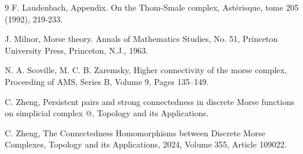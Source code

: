 \documentclass[a4paper,12pt,notitlepage]{amsart}
\makeatletter
\theoremstyle{definition}%
\theoremstyle{definition}%
\theoremstyle{definition}%
\newcommand*{\rom}[1]{\expandafter\@slowromancap\romannumeral #1@}
\makeatother
\begin{document}
\begin{thebibliography}{9}
F.  Laudenbach,
Appendix. On the Thom-Smale complex,
Astérisque, tome 205 (1992),  219-233.


J. Milnor, Morse theory.  Annals of Mathematics
Studies, No. 51, Princeton University Press, Princeton, N.J., 1963.








N. A. Scoville, M. C. B. Zaremsky,
Higher connectivity of the morse complex,
Proceeding of AMS, Series B,
Volume 9, Pages 135–149.



C. Zheng,
Persistent pairs and strong connectedness in discrete Morse functions on simplicial complex \rom{1},  Topology and its Applications.



C. Zheng,
The Connectedness Homomorphisms between Discrete Morse Complexes,
Topology and its Applications, 2024, Volume 355, Article 109022.




\end{thebibliography}
\end{document}
